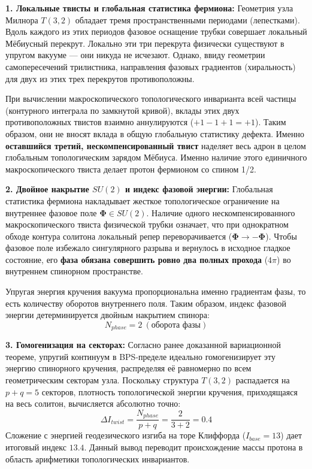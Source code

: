 \documentclass[12pt,a4paper]{article}
\begin{document}
	\textbf{1. Локальные твисты и глобальная статистика фермиона:}
	Геометрия узла Милнора $T(3,2)$ обладает тремя пространственными периодами (лепестками). Вдоль каждого из этих периодов фазовое оснащение трубки совершает локальный Мёбиусный перекрут. Локально эти три перекрута физически существуют в упругом вакууме — они никуда не исчезают. 
	Однако, ввиду геометрии самопересечений трилистника, направления фазовых градиентов (хиральность) для двух из этих трех перекрутов противоположны. 
	
	При вычислении макроскопического топологического инварианта всей частицы (контурного интеграла по замкнутой кривой), вклады этих двух противоположных твистов взаимно аннулируются ($+1 - 1 + 1 = +1$). Таким образом, они не вносят вклада в общую глобальную статистику дефекта. 
	Именно \textbf{оставшийся третий, нескомпенсированный твист} наделяет весь адрон в целом глобальным топологическим зарядом Мёбиуса. Именно наличие этого единичного макроскопического твиста делает протон фермионом со спином 1/2.
	
	\textbf{2. Двойное накрытие $SU(2)$ и индекс фазовой энергии:}
	Глобальная статистика фермиона накладывает жесткое топологическое ограничение на внутреннее фазовое поле $\boldsymbol{\Phi} \in SU(2)$. Наличие одного нескомпенсированного макроскопического твиста физической трубки означает, что при однократном обходе контура солитона локальный репер переворачивается ($\boldsymbol{\Phi} \to -\boldsymbol{\Phi}$). 
	Чтобы фазовое поле избежало сингулярного разрыва и вернулось в исходное гладкое состояние, его \textbf{фаза обязана совершить ровно два полных прохода} ($4\pi$) во внутреннем спинорном пространстве.
	
	Упругая энергия кручения вакуума пропорциональна именно градиентам фазы, то есть количеству оборотов внутреннего поля. Таким образом, индекс фазовой энергии детерминируется двойным накрытием спинора:
	\begin{equation}
		N_{phase} = 2 \ (\text{оборота фазы})
	\end{equation}
	
	\textbf{3. Гомогенизация на секторах:}
	Согласно ранее доказанной вариационной теореме, упругий континуум в BPS-пределе идеально гомогенизирует эту энергию спинорного кручения, распределяя её равномерно по всем геометрическим секторам узла. Поскольку структура $T(3,2)$ распадается на $p+q = 5$ секторов, плотность топологической энергии кручения, приходящаяся на весь солитон, вычисляется абсолютно точно:
	\begin{equation}
		\Delta I_{twist} = \frac{N_{phase}}{p+q} = \frac{2}{3+2} = \mathbf{0.4}
	\end{equation}
	Сложение с энергией геодезического изгиба на торе Клиффорда ($I_{base} = 13$) дает итоговый индекс $13.4$. Данный вывод переводит происхождение массы протона в область арифметики топологических инвариантов.
	
\end{document}
